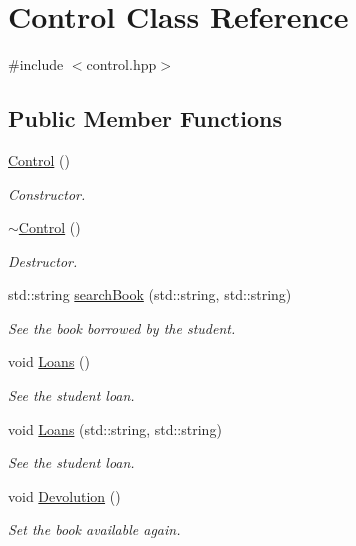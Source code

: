 \hypertarget{classControl}{}\section{Control Class Reference}
\label{classControl}


{\ttfamily \#include $<$control.\+hpp$>$}

\subsection*{Public Member Functions}
\begin{DoxyCompactItemize}
\item 
\hyperlink{classControl_aa730aeda4517f40bc48ba1e46ebded77}{Control} ()
\begin{DoxyCompactList}\small\item\em Constructor. \end{DoxyCompactList}\item 
\hyperlink{classControl_aedda1328c4f8b8d49bca8f0812d3bfd1}{$\sim$\+Control} ()
\begin{DoxyCompactList}\small\item\em Destructor. \end{DoxyCompactList}\item 
std\+::string \hyperlink{classControl_a7719518366f488614467555e53a6d0c2}{search\+Book} (std\+::string, std\+::string)
\begin{DoxyCompactList}\small\item\em See the book borrowed by the student. \end{DoxyCompactList}\item 
void \hyperlink{classControl_ad413782c762539562d2ff9401a54eab3}{Loans} ()
\begin{DoxyCompactList}\small\item\em See the student loan. \end{DoxyCompactList}\item 
void \hyperlink{classControl_a4e5343c4033003b873eac91e72c0f8f6}{Loans} (std\+::string, std\+::string)
\begin{DoxyCompactList}\small\item\em See the student loan. \end{DoxyCompactList}\item 
void \hyperlink{classControl_a855e5c015aef0ed0194d184f326439e3}{Devolution} ()
\begin{DoxyCompactList}\small\item\em Set the book available again. \end{DoxyCompactList}\item 

\end{DoxyCompactItemize}
